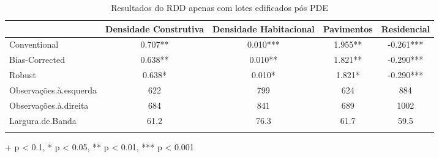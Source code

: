 \begin{table}[!t]
\caption{Resultados do RDD apenas com lotes edificados pós PDE} 
\fontsize{10pt}{12pt}\selectfont
\begin{tabular*}{\linewidth}{@{\extracolsep{\fill}}lcccc}
\toprule
  & Densidade Construtiva & Densidade Habitacional & Pavimentos & Residencial \\ 
\midrule\addlinespace[2.5pt]
Conventional & 0.707** & 0.010*** & 1.955** & -0.261*** \\ 
Bias-Corrected & 0.638** & 0.010** & 1.821** & -0.290*** \\ 
{Robust} & {0.638*} & {0.010*} & {1.821*} & {-0.290***} \\ 
\midrule
Observações.à.esquerda & 622 & 799 & 624 & 884 \\ 
Observações.à.direita & 684 & 841 & 689 & 1002 \\ 
Largura.de.Banda & 61.2 & 76.3 & 61.7 & 59.5 \\ 
\bottomrule
\label{tab:rdd-IPTU}
\end{tabular*}
\begin{minipage}{\linewidth}
+ p < 0.1, * p < 0.05, ** p < 0.01, *** p < 0.001\\
\end{minipage}
\end{table}

